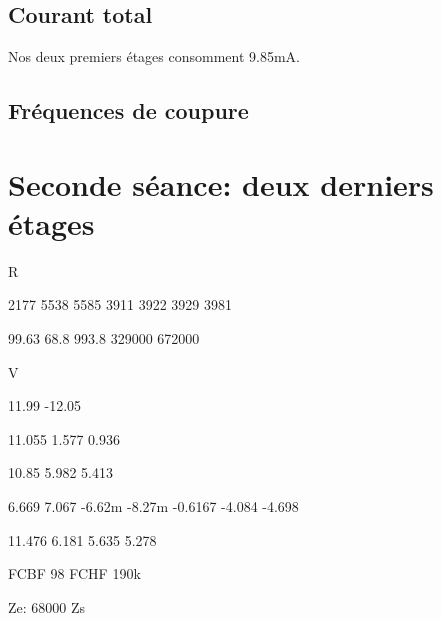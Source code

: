 \subsection{Courant total}
Nos deux premiers étages consomment 9.85mA.

\subsection{Fréquences de coupure}

\section{Seconde séance: deux derniers étages}

R

2177
5538
5585
3911
3922
3929
3981

99.63
68.8
993.8
329000
672000

V

11.99
-12.05

11.055
1.577
0.936

10.85
5.982
5.413

6.669 7.067
-6.62m -8.27m
-0.6167
-4.084
-4.698

11.476
6.181
5.635
5.278

FCBF 98
FCHF 190k

Ze: 68000
Zs

